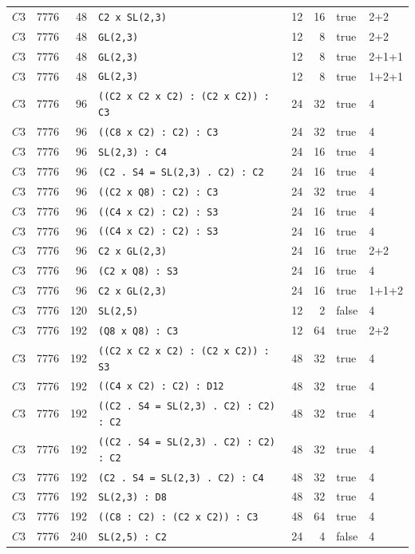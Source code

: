 \begin{longtable}{llrlrrll}
$C3$ & 7776 & 48 & \texttt{C2 x SL(2,3)} & 12 & 16 & true & 2+2\\
$C3$ & 7776 & 48 & \texttt{GL(2,3)} & 12 & 8 & true & 2+2\\
$C3$ & 7776 & 48 & \texttt{GL(2,3)} & 12 & 8 & true & 2+1+1\\
$C3$ & 7776 & 48 & \texttt{GL(2,3)} & 12 & 8 & true & 1+2+1\\
$C3$ & 7776 & 96 & \texttt{((C2 x C2 x C2) : (C2 x C2)) : C3} & 24 & 32 & true & 4\\
$C3$ & 7776 & 96 & \texttt{((C8 x C2) : C2) : C3} & 24 & 32 & true & 4\\
$C3$ & 7776 & 96 & \texttt{SL(2,3) : C4} & 24 & 16 & true & 4\\
$C3$ & 7776 & 96 & \texttt{(C2 . S4 = SL(2,3) . C2) : C2} & 24 & 16 & true & 4\\
$C3$ & 7776 & 96 & \texttt{((C2 x Q8) : C2) : C3} & 24 & 32 & true & 4\\
$C3$ & 7776 & 96 & \texttt{((C4 x C2) : C2) : S3} & 24 & 16 & true & 4\\
$C3$ & 7776 & 96 & \texttt{((C4 x C2) : C2) : S3} & 24 & 16 & true & 4\\
$C3$ & 7776 & 96 & \texttt{C2 x GL(2,3)} & 24 & 16 & true & 2+2\\
$C3$ & 7776 & 96 & \texttt{(C2 x Q8) : S3} & 24 & 16 & true & 4\\
$C3$ & 7776 & 96 & \texttt{C2 x GL(2,3)} & 24 & 16 & true & 1+1+2\\
$C3$ & 7776 & 120 & \texttt{SL(2,5)} & 12 & 2 & false & 4\\
$C3$ & 7776 & 192 & \texttt{(Q8 x Q8) : C3} & 12 & 64 & true & 2+2\\
$C3$ & 7776 & 192 & \texttt{((C2 x C2 x C2) : (C2 x C2)) : S3} & 48 & 32 & true & 4\\
$C3$ & 7776 & 192 & \texttt{((C4 x C2) : C2) : D12} & 48 & 32 & true & 4\\
$C3$ & 7776 & 192 & \texttt{((C2 . S4 = SL(2,3) . C2) : C2) : C2} & 48 & 32 & true & 4\\
$C3$ & 7776 & 192 & \texttt{((C2 . S4 = SL(2,3) . C2) : C2) : C2} & 48 & 32 & true & 4\\
$C3$ & 7776 & 192 & \texttt{(C2 . S4 = SL(2,3) . C2) : C4} & 48 & 32 & true & 4\\
$C3$ & 7776 & 192 & \texttt{SL(2,3) : D8} & 48 & 32 & true & 4\\
$C3$ & 7776 & 192 & \texttt{((C8 : C2) : (C2 x C2)) : C3} & 48 & 64 & true & 4\\
$C3$ & 7776 & 240 & \texttt{SL(2,5) : C2} & 24 & 4 & false & 4\\

\end{longtable}
